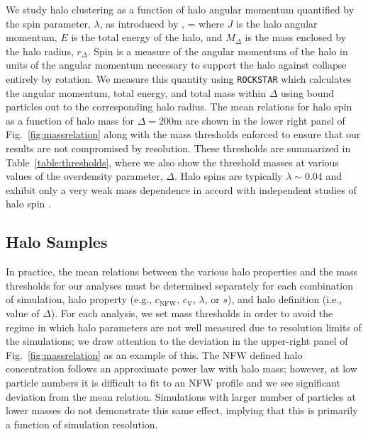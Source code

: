 \documentclass[usenatbib,fleqn]{mnras}
\begin{document}
We study halo clustering as a function of halo angular momentum quantified by the spin parameter, $\lambda$, as introduced by \citep{peebles69},
\beq
\lambda = 
\eeq
where $J$ is the halo angular momentum, $E$ is the total energy of the halo, and $M_{\Delta}$ is the mass enclosed by the halo radius, $r_{\Delta}$. Spin is a measure of the angular momentum of the halo in units of the angular momentum necessary to support the halo against collapse entirely by rotation. We measure this quantity using {\tt ROCKSTAR} which calculates the angular momentum, total energy, and total mass within $\Delta$ using bound particles out to the corresponding halo radius. The mean relations for halo spin as a function of halo mass for $\Delta=200$m are shown in the lower right panel of Fig.~\ref{fig:massrelation} along with the mass thresholds enforced to ensure that our results are not compromised by resolution. These thresholds are summarized in Table~\ref{table:thresholds}, where we also show the threshold masses at various values of the overdensity parameter, $\Delta$. Halo spins are typically $\lambda \sim 0.04$ and exhibit only a very weak mass dependence in accord with independent studies of halo spin 
\citep[e.g.][]{bullock_etal02,maccio_etal07}.

\subsection{Halo Samples}

In practice, the mean relations between the various halo properties and the mass 
thresholds for our analyses must be determined separately for each combination of simulation, halo property (e.g., $c_{\mathrm{NFW}}$, $c_{\mathrm{V}}$, $\lambda$, or $s$), and halo definition (i.e., value of $\Delta$). For each analysis, we set mass thresholds in order to avoid the regime in which halo parameters are not well measured due to resolution limits of the simulations; we draw attention to the deviation in the upper-right panel of Fig.~\ref{fig:massrelation} as an example of this. The NFW defined halo concentration follows an approximate power law with halo mass; however, at low particle numbers it is difficult to fit to an NFW profile and we see significant deviation from the mean relation. Simulations with larger number of particles at lower masses do not demonstrate this same effect, implying that this is primarily a function of simulation resolution.
\end{document}
